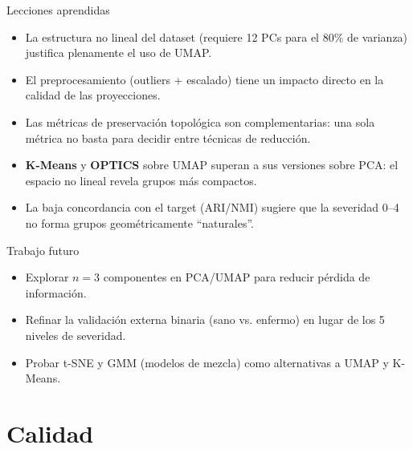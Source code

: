 \documentclass[10pt,aspectratio=169]{beamer}
\begin{document}
\begin{frame}{Lecciones aprendidas}
  \begin{itemize}
    \item La estructura no lineal del dataset (requiere 12 PCs para el 80\% de varianza) justifica plenamente el uso de UMAP.
    \item El preprocesamiento (outliers + escalado) tiene un impacto directo en la calidad de las proyecciones.
    \item Las métricas de preservación topológica son complementarias: una sola métrica no basta para decidir entre técnicas de reducción.
    \item \textbf{K-Means} y \textbf{OPTICS} sobre UMAP superan a sus versiones sobre PCA: el espacio no lineal revela grupos más compactos.
    \item La baja concordancia con el target (ARI/NMI) sugiere que la severidad 0--4 no forma grupos geométricamente ``naturales''.
  \end{itemize}

  \vspace{0.3cm}
  \begin{block}{Trabajo futuro}
    \begin{itemize}
      \item Explorar $n=3$ componentes en PCA/UMAP para reducir pérdida de información.
      \item Refinar la validación externa binaria (sano vs. enfermo) en lugar de los 5 niveles de severidad.
      \item Probar t-SNE y GMM (modelos de mezcla) como alternativas a UMAP y K-Means.
    \end{itemize}
  \end{block}
\end{frame}

\section{Calidad}
\end{document}
